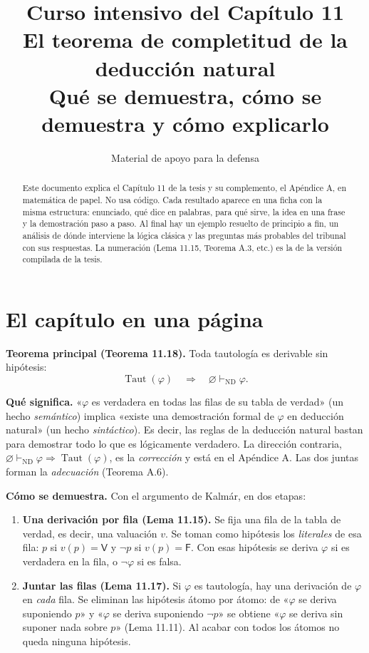 \documentclass[11pt,a4paper]{article}
\title{\textbf{Curso intensivo del Capítulo 11}\\[4pt]
  \Large El teorema de completitud de la deducción natural\\[2pt]
  \large Qué se demuestra, cómo se demuestra y cómo explicarlo}
\author{Material de apoyo para la defensa}
\date{}
\newcommand{\Provnd}{\vdash_{\mathrm{ND}}}
\newcommand{\Not}{\neg}
\newcommand{\Taut}{\operatorname{Taut}}
\newcommand{\V}{\mathsf{V}}
\newcommand{\F}{\mathsf{F}}
\begin{document}
\maketitle
\thispagestyle{empty}

\begin{abstract}
\noindent
Este documento explica el Capítulo 11 de la tesis y su complemento, el
Apéndice A, en matemática de papel. No usa código. Cada resultado aparece en una
ficha con la misma estructura: enunciado, qué dice en palabras, para qué sirve,
la idea en una frase y la demostración paso a paso. Al final hay un ejemplo
resuelto de principio a fin, un análisis de dónde interviene la lógica clásica y
las preguntas más probables del tribunal con sus respuestas. La numeración
(Lema 11.15, Teorema A.3, etc.) es la de la versión compilada de la tesis.
\end{abstract}

\tableofcontents
\newpage

\section{El capítulo en una página}

\begin{clave}
\centering
\textbf{Teorema principal (Teorema 11.18).}\quad
Toda tautología es derivable sin hipótesis:
\[
\Taut(\varphi)\quad\Longrightarrow\quad\varnothing\Provnd\varphi .
\]
\end{clave}

\textbf{Qué significa.} «\(\varphi\) es verdadera en todas las filas de su
tabla de verdad» (un hecho \emph{semántico}) implica «existe una demostración
formal de \(\varphi\) en deducción natural» (un hecho \emph{sintáctico}). Es
decir, las reglas de la deducción natural bastan para demostrar todo lo que es
lógicamente verdadero. La dirección contraria, \(\varnothing\Provnd\varphi
\Rightarrow\Taut(\varphi)\), es la \emph{corrección} y está en el Apéndice A.
Las dos juntas forman la \emph{adecuación} (Teorema A.6).

\textbf{Cómo se demuestra.} Con el argumento de Kalmár, en dos etapas:

\begin{enumerate}
  \item \textbf{Una derivación por fila (Lema 11.15).} Se fija una fila de la
    tabla de verdad, es decir, una valuación \(v\). Se toman como hipótesis
    los \emph{literales} de esa fila: \(p\) si \(v(p)=\V\) y \(\Not p\) si
    \(v(p)=\F\). Con esas hipótesis se deriva \(\varphi\) si es verdadera en la
    fila, o \(\Not\varphi\) si es falsa.
  \item \textbf{Juntar las filas (Lema 11.17).} Si \(\varphi\) es tautología,
    hay una derivación de \(\varphi\) en \emph{cada} fila. Se eliminan las
    hipótesis átomo por átomo: de «\(\varphi\) se deriva suponiendo \(p\)» y
    «\(\varphi\) se deriva suponiendo \(\Not p\)» se obtiene «\(\varphi\) se
    deriva sin suponer nada sobre \(p\)» (Lema 11.11). Al acabar con todos los
    átomos no queda ninguna hipótesis.
\end{enumerate}
\end{document}
